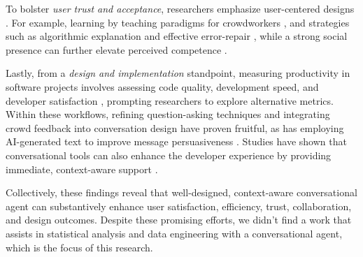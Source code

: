 To bolster \textit{user trust and acceptance}, researchers emphasize user-centered designs \citep{schmitt2022, Amershi2019}. For example, learning by teaching paradigms for crowdworkers \citep{Chhibber2022}, and strategies such as algorithmic explanation and effective error-repair \citep{Do2023, Do2022}, while a strong social presence can further elevate perceived competence \citep{schmid2022}. 

Lastly, from a \textit{design and implementation} standpoint, measuring productivity in software projects involves assessing code quality, development speed, and developer satisfaction \citep{McConnell2006, Sadowski2015}, prompting researchers to explore alternative metrics. Within these workflows, refining question-asking techniques \citep{Hu2024} and integrating crowd feedback into conversation design \citep{choi2021} have proven fruitful, as has employing AI-generated text to improve message persuasiveness \citep{karinshak2023}. Studies have shown that conversational tools can also enhance the developer experience by providing immediate, context-aware support \citep{Wang2018}. 

Collectively, these findings reveal that well-designed, context-aware conversational agent can substantively enhance user satisfaction, efficiency, trust, collaboration, and design outcomes. Despite these promising efforts, we didn't find a work that assists in statistical analysis and data engineering with a conversational agent, which is the focus of this research.